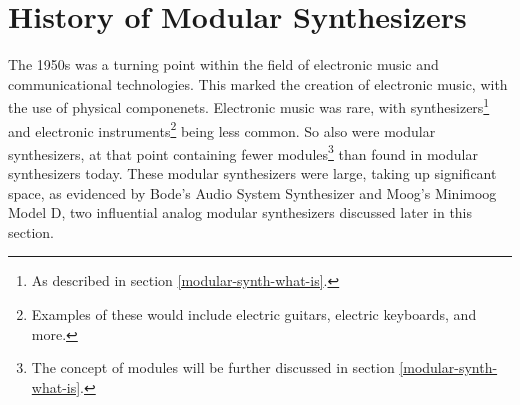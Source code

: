 \section[History of Modular Synthesizers]{History of Modular Synthesizers}\label{mod-synth-history}

The 1950s was a turning point within the field of electronic music and communicational technologies. This marked the creation of electronic music, with the use of physical componenets. Electronic music was rare, with synthesizers\footnote{As described in section \ref{modular-synth-what-is}.} and electronic instruments\footnote{Examples of these would include electric guitars, electric keyboards, and more.} being less common. So also were modular synthesizers, at that point containing fewer modules\footnote{The concept of modules will be further discussed in section \ref{modular-synth-what-is}.} than found in modular synthesizers today. These modular synthesizers were large, taking up significant space, as evidenced by Bode's Audio System Synthesizer and Moog's Minimoog Model D, two influential analog modular synthesizers discussed later in this section.

